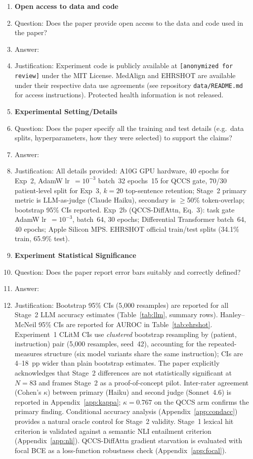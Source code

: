 \documentclass{article}
\begin{document}
\begin{enumerate}
\item {\bf Open access to data and code}
  \item[] Question: Does the paper provide open access to the data and code
    used in the paper?
  \item[] Answer: \answerYes{}
  \item[] Justification: Experiment code is publicly available at
    \texttt{[anonymized for review]} under the MIT
    License. MedAlign and EHRSHOT are available under their respective data use
    agreements (see repository \texttt{data/README.md} for access instructions).
    Protected health information is not released.

\item {\bf Experimental Setting/Details}
  \item[] Question: Does the paper specify all the training and test
    details (e.g.\ data splits, hyperparameters, how they were selected) to
    support the claims?
  \item[] Answer: \answerYes{}
  \item[] Justification: All details provided: A10G GPU hardware, 40 epochs
    for Exp~2, AdamW lr~$= 10^{-3}$ batch~32 epochs~15 for QCCS gate,
    70/30 patient-level split for Exp~3, $k=20$ top-sentence retention;
    Stage~2 primary metric is LLM-as-judge (Claude Haiku), secondary is
    $\geq$50\% token-overlap; bootstrap 95\% CIs reported.
    Exp~2b (QCCS-DiffAttn, Eq.~3): task gate AdamW lr~$=10^{-3}$, batch~64,
    30 epochs; Differential Transformer batch~64, 40 epochs; Apple Silicon MPS.
    EHRSHOT official train/test splits (34.1\% train, 65.9\% test).

\item {\bf Experiment Statistical Significance}
  \item[] Question: Does the paper report error bars suitably and correctly
    defined?
  \item[] Answer: \answerYes{}
  \item[] Justification: Bootstrap 95\% CIs (5,000 resamples) are reported for
    all Stage~2 LLM accuracy estimates (Table~\ref{tab:llm}, summary rows).
    Hanley--McNeil 95\% CIs are reported for AUROC in Table~\ref{tab:ehrshot}.
    Experiment~1 CLitM CIs use \emph{clustered} bootstrap resampling by
    (patient, instruction) pair (5,000 resamples, seed~42), accounting for
    the repeated-measures structure (six model variants share the same
    instruction); CIs are 4--18~pp wider than plain bootstrap estimates.
    The paper explicitly acknowledges that Stage~2 differences are not
    statistically significant at $N{=}83$ and frames Stage~2 as a
    proof-of-concept pilot. Inter-rater agreement (Cohen's $\kappa$) between
    primary (Haiku) and second judge (Sonnet~4.6) is reported in
    Appendix~\ref{app:kappa}; $\kappa = 0.767$ on the QCCS arm confirms the
    primary finding. Conditional accuracy analysis (Appendix~\ref{app:condacc})
    provides a natural oracle control for Stage~2 validity. Stage~1 lexical
    hit criterion is validated against a semantic NLI entailment criterion
    (Appendix~\ref{app:nli}). QCCS-DiffAttn gradient starvation is evaluated
    with focal BCE as a loss-function robustness check (Appendix~\ref{app:focal}).


\end{enumerate}
\end{document}
